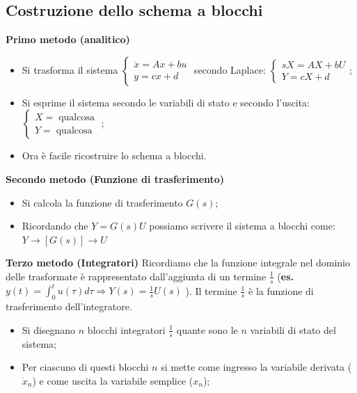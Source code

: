 \begin{landscape}
\begin{multicols*}{3}
    \subsection{Costruzione dello schema a blocchi}
    \textbf{Primo metodo (analitico)}
    \begin{itemize}
        \item Si trasforma il sistema $\begin{cases}
            \dot{x} = A x + bu\\ y = cx +d
        \end{cases}$ secondo Laplace: $\begin{cases}
            s X = A X + b U\\ Y = c X + d
        \end{cases}$;
        \item Si esprime il sistema secondo le variabili di stato e secondo l'uscita:$\begin{cases}
            X = \;\text{qualcosa}\;\\ Y = \;\text{qualcosa}\;
        \end{cases}$;
        \item Ora è facile ricostruire lo schema a blocchi.
    \end{itemize}
    \textbf{Secondo metodo (Funzione di trasferimento)}
    \begin{itemize}
        \item Si calcola la funzione di trasferimento $G(s)$;
        \item Ricordando che $Y = G(s) U$ possiamo scrivere il sistema a blocchi come: $Y \longrightarrow \left[G(s)\right] \longrightarrow U$
    \end{itemize}
    \textbf{Terzo metodo (Integratori)}\newline
    Ricordiamo che la funzione integrale nel dominio delle trasformate è rappresentato dall'aggiunta di un termine $\frac{1}{s}$ (\textbf{es.} $y(t) = \int_{0}^{t}u(\tau)d \tau \Rightarrow Y(s) = \frac{1}{s} U(s)$ ).\newline
    Il termine $\frac{1}{s}$ è la funzione di trasferimento dell'integratore.
    \begin{itemize}
        \item Si disegnano $n$ blocchi integratori $\frac{1}{s}$ quante sono le $n$ variabili di stato del sistema;
        \item Per ciascuno di questi blocchi $n$ si mette come ingresso la variabile derivata ($\dot{x}_n$) e come uscita la variabile semplice ($x_n$);

\end{itemize}
\end{multicols*}
\end{landscape}
